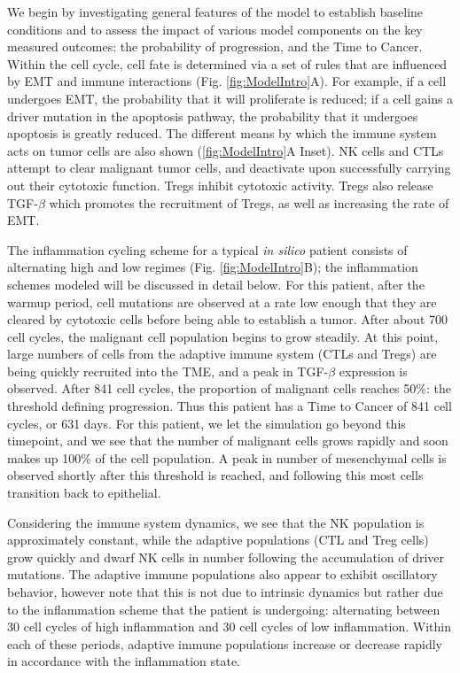 \documentclass[11pt]{article}
\begin{document}
We begin by investigating general features of the model to establish baseline conditions and to assess the impact of various model components on the key measured outcomes: the probability of progression, and the Time to Cancer. 
Within the cell cycle, cell fate is determined via a set of rules that are influenced by EMT and immune interactions (Fig. \ref{fig:ModelIntro}A). For example, if a cell undergoes EMT, the probability that it will proliferate is reduced; if a cell gains a driver mutation in the apoptosis pathway, the probability that it undergoes apoptosis is greatly reduced.
The different means by which the immune system acts on tumor cells are also shown (\ref{fig:ModelIntro}A Inset). NK cells and CTLs attempt to clear malignant tumor cells, and deactivate upon successfully carrying out their cytotoxic function.
Tregs inhibit cytotoxic activity.
Tregs also release TGF-$\beta$ which promotes the recruitment of Tregs, as well as increasing the rate of EMT.
\par
The inflammation cycling scheme for a typical {\it in silico} patient consists of alternating high and low regimes (Fig. \ref{fig:ModelIntro}B); the inflammation schemes modeled will be discussed in detail below.
For this patient, after the warmup period, cell mutations are observed at a rate low enough that they are cleared by cytotoxic cells before being able to establish a tumor.
After about 700 cell cycles, the malignant cell population begins to grow steadily.
At this point, large numbers of cells from the adaptive immune system (CTLs and Tregs) are being quickly recruited into the TME, and a peak in TGF-$\beta$ expression is observed.
After 841 cell cycles, the proportion of malignant cells reaches 50\%: the threshold defining progression.
Thus this patient has a Time to Cancer of 841 cell cycles, or 631 days.
For this patient, we let the simulation go beyond this timepoint, and we see that the number of malignant cells grows rapidly and soon makes up 100\% of the cell population.
A peak in number of mesenchymal cells is observed shortly after this threshold is reached, and following this most cells transition back to epithelial.
\par 
Considering the immune system dynamics, we see that the NK population is approximately constant, while the adaptive populations (CTL and Treg cells) grow quickly and dwarf NK cells in number following the accumulation of driver mutations.
The adaptive immune populations also appear to exhibit oscillatory behavior, however note that this is not due to intrinsic dynamics but rather due to the inflammation scheme that the patient is undergoing: alternating between 30 cell cycles of high inflammation and 30 cell cycles of low inflammation. Within each of these periods, adaptive immune populations increase or decrease rapidly in accordance with the inflammation state.
\end{document}
